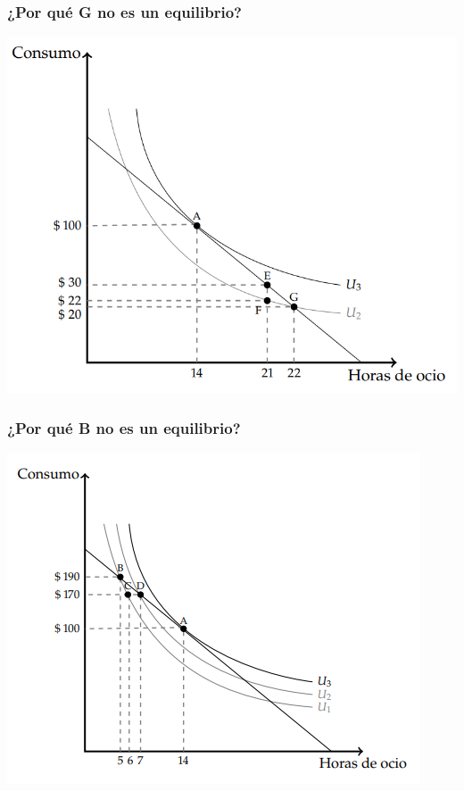 \documentclass{beamer}
\begin{document}
\begin{frame}
  \frametitle{¿Por qué G no es un equilibrio?}
  \begin{center}
    \includegraphics[scale=0.45]{../Figures/C9.6.png}
  \end{center}
\end{frame}

\begin{frame}
  \frametitle{¿Por qué B no es un equilibrio?}
  \begin{center}
    \includegraphics[scale=0.9]{../Figures/C9.5.png}
  \end{center}
\end{frame}
\end{document}
